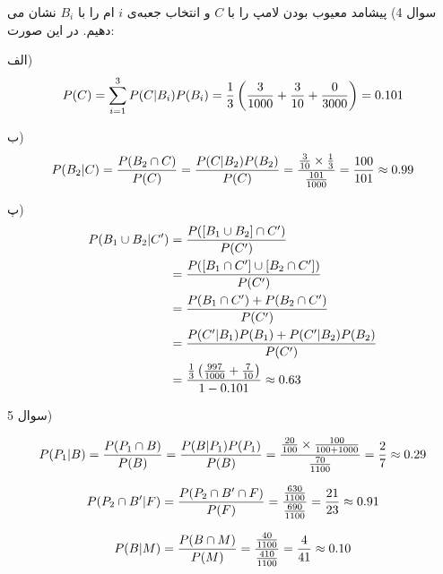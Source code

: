 \documentclass[10pt,letterpaper]{article}
\begin{document}
سوال 4) پیشامد معیوب بودن لامپ را با $C$ و انتخاب جعبه‌ی $i$ ام را با $B_i$ نشان می دهیم. در این صورت:

الف)
$$
P(C)=\sum_{i=1}^{3}P(C|B_i)P(B_i)
={1\over 3}\left({3\over 1000}+{3\over 10}+{0\over 3000}\right)=0.101
$$

ب)
$$
P(B_2|C)={P(B_2\cap C)\over P(C)}={P(C|B_2)P(B_2)\over P(C)}
={{3\over 10}\times {1\over 3}\over {101\over 1000}}={100\over 101}\approx0.99
$$

پ)
\[
\begin{split}
P(B_1\cup B_2|C')&=
{P([B_1\cup B_2]\cap C')\over P(C')}
\\&=
{P([B_1\cap C']\cup [B_2\cap C'])\over P(C')}
\\&=
{P(B_1\cap C')+P(B_2\cap C')\over P(C')}
\\&=
{P(C'|B_1)P(B_1)+P(C'|B_2)P(B_2)\over P(C')}
\\&=
{{1\over 3}\left({997\over 1000}+{7\over 10}\right)
\over
1-0.101
}
\approx0.63
\end{split}
\]

سوال 5)

$$
P(P_1|B)={P(P_1\cap B)\over P(B)}={P(B|P_1)P(P_1)\over P(B)}
={{20\over 100}\times{100\over 100+1000}\over {70\over 1100}}={2\over 7}\approx 0.29
$$

$$
P(P_2\cap B'|F)={P(P_2\cap B'\cap F)\over P(F)}
={{630\over 1100}\over {690\over 1100}}={21\over 23}\approx 0.91
$$

$$
P(B|M)={P(B\cap M)\over P(M)}={{40\over 1100}\over {410\over 1100}}
={4\over 41}\approx 0.10
$$
%
%
\end{document}
